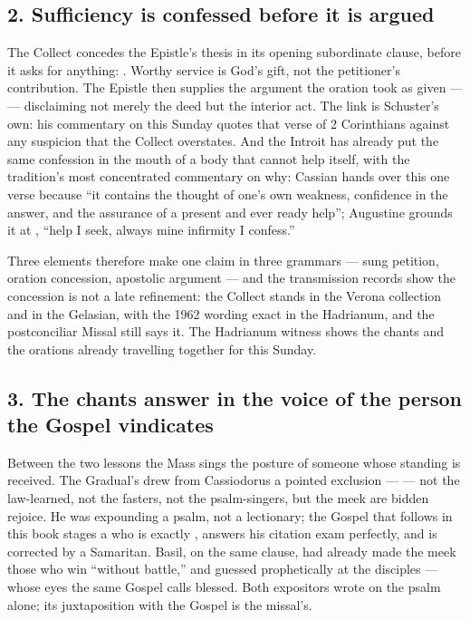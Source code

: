 \subsection*{2. Sufficiency is confessed before it is argued}

The Collect concedes the Epistle's thesis in its opening subordinate clause,
before it asks for anything: . Worthy service is God's gift, not the
petitioner's contribution. The Epistle then supplies the argument the oration
took as given ---  --- disclaiming not
merely the deed but the interior act. The link is Schuster's own: his
commentary on this Sunday quotes that verse of 2 Corinthians against any
suspicion that the Collect overstates. And the Introit has already put the
same confession in the mouth of a body that cannot help itself, with the
tradition's most concentrated commentary on why: Cassian hands over this one
verse because ``it contains the thought of one's own weakness, confidence in
the answer, and the assurance of a present and ever ready help''; Augustine
grounds it at , ``help I seek, always
mine infirmity I confess.''

Three elements therefore make one claim in three grammars --- sung petition,
oration concession, apostolic argument --- and the transmission records show
the concession is not a late refinement: the Collect stands in the Verona
collection and in the Gelasian, with the 1962 wording exact in the Hadrianum,
and the postconciliar Missal still says it. The Hadrianum witness shows the
chants and the orations already travelling together for this Sunday.

\subsection*{3. The chants answer in the voice of the person the Gospel vindicates}

Between the two lessons the Mass sings the posture of someone whose standing
is received. The Gradual's  drew from Cassiodorus a
pointed exclusion ---  --- not the law-learned, not the fasters, not the
psalm-singers, but the meek are bidden rejoice. He was expounding a psalm, not
a lectionary; the Gospel that follows in this book stages a
 who is exactly , answers his citation
exam perfectly, and is corrected by a Samaritan. Basil, on the same clause,
had already made the meek those who win ``without battle,'' and guessed
prophetically at the disciples --- whose eyes the same Gospel calls blessed.
Both expositors wrote on the psalm alone; its juxtaposition with the Gospel is
the missal's.

